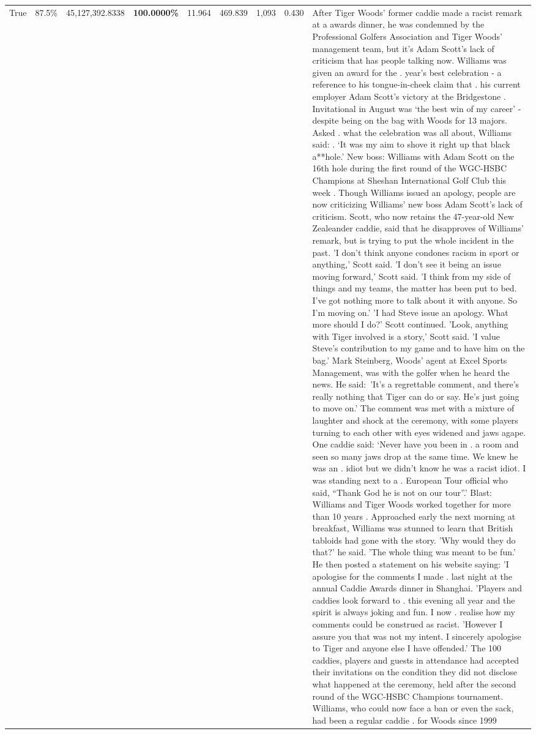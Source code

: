 \begin{table}[H]
\begin{tabular}{lllrlllll}
True & 87.5\% & 45,127,392.8338 & \bfseries \color{red} 100.0000\% & 11.964 & 469.839 & 1,093 & 0.430 & After Tiger Woods' former caddie made a racist remark at a awards dinner, he was condemned by the Professional Golfers Association and Tiger Woods' management team, but it's Adam Scott's lack of criticism that has people talking now. Williams was given an award for the . year’s best celebration - a reference to his tongue-in-cheek claim that . his current employer Adam Scott’s victory at the Bridgestone . Invitational in August was ‘the best win of my career’ - despite being on the bag with Woods for 13 majors. Asked . what the celebration was all about, Williams said: . ‘It was my aim to shove it right up that black a**hole.’ New boss: Williams with Adam Scott  on the 16th hole during the first round of the WGC-HSBC Champions at Sheshan International Golf Club this week . Though Williams issued an apology, people are now criticizing Williams' new boss Adam Scott's lack of criticism. Scott, who now retains the 47-year-old New Zealeander caddie, said that he disapproves of Williams' remark, but is trying to put the whole incident in the past. 'I don't think anyone condones racism in sport or anything,' Scott said. 'I don't see it being an issue moving forward,' Scott said. 'I think from my side of things and my teams, the matter has been put to bed. I've got nothing more to talk about it with anyone. So I'm moving on.' 'I had Steve issue an apology. What more should I do?' Scott continued. 'Look, anything with Tiger involved is a story,' Scott said. 'I value Steve's contribution to my game and to have him on the bag.' Mark Steinberg, Woods' agent at Excel Sports Management, was with the golfer when he heard the news. He said: 'It's a regrettable comment, and there's really nothing that Tiger can do or say. He's just going to move on.' The comment was met with a mixture of laughter and shock at the ceremony, with some players turning to each other with eyes widened and jaws agape. One caddie said: ‘Never have you been in . a room and seen so many jaws drop at the same time. We knew he was an . idiot but we didn’t know he was a racist idiot. I was standing next to a . European Tour official who said, “Thank God he is not on our tour”.’ Blast: Williams and Tiger Woods worked together for more than 10 years . Approached early the next morning at breakfast, Williams was stunned to learn that British tabloids had gone with the story. 'Why would they do that?' he said. 'The whole thing was meant to be fun.' He then posted a statement on his website saying: 'I apologise for the comments I made . last night at the annual Caddie Awards dinner in Shanghai. 'Players and caddies look forward to . this evening all year and the spirit is always joking and fun. I now . realise how my comments could be construed as racist. 'However I assure you that was not my intent. I sincerely apologise to Tiger and anyone else I have offended.' The 100 caddies, players and guests in attendance had accepted their invitations on the condition they did not disclose what happened at the ceremony, held after the second round of the WGC-HSBC Champions tournament. Williams, who could now face a ban or even the sack, had been a regular caddie . for Woods since 1999 
\end{tabular}
\end{table}
